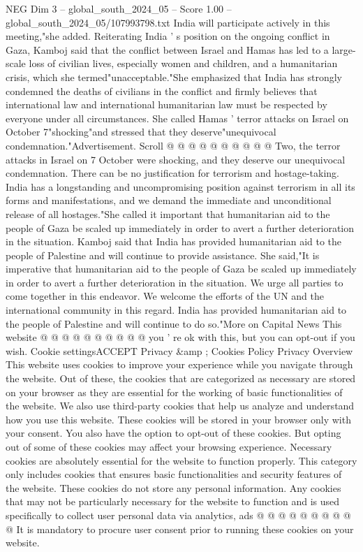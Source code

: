 \begin{textsample}{NEG Dim 3 – global\_south\_2024\_05 – Score 1.00 – global\_south\_2024\_05/107993798.txt}
India will participate actively in this meeting,"she added.
Reiterating India ' s position on the ongoing conflict in Gaza, Kamboj said that the conflict between Israel and Hamas has led to a large-scale loss of civilian lives, especially women and children, and a humanitarian crisis, which she termed"unacceptable."She emphasized that India has strongly condemned the deaths of civilians in the conflict and firmly believes that international law and international humanitarian law must be respected by everyone under all circumstances.
She called Hamas ' terror attacks on Israel on October 7"shocking"and stressed that they deserve"unequivocal condemnation."Advertisement.
Scroll @ @ @ @ @ @ @ @ @ @ Two, the terror attacks in Israel on 7 October were shocking, and they deserve our unequivocal condemnation.
There can be no justification for terrorism and hostage-taking.
India has a longstanding and uncompromising position against terrorism in all its forms and manifestations, and we demand the immediate and unconditional release of all hostages."She called it important that humanitarian aid to the people of Gaza be scaled up immediately in order to avert a further deterioration in the situation.
Kamboj said that India has provided humanitarian aid to the people of Palestine and will continue to provide assistance.
She said,"It is imperative that humanitarian aid to the people of Gaza be scaled up immediately in order to avert a further deterioration in the situation.
We urge all parties to come together in this endeavor.
We welcome the efforts of the UN and the international community in this regard.
India has provided humanitarian aid to the people of Palestine and will continue to do so."More on Capital News This website @ @ @ @ @ @ @ @ @ @ you ' re ok with this, but you can opt-out if you wish.
Cookie settingsACCEPT Privacy \&amp ; Cookies Policy Privacy Overview This website uses cookies to improve your experience while you navigate through the website.
Out of these, the cookies that are categorized as necessary are stored on your browser as they are essential for the working of basic functionalities of the website.
We also use third-party cookies that help us analyze and understand how you use this website.
These cookies will be stored in your browser only with your consent.
You also have the option to opt-out of these cookies.
But opting out of some of these cookies may affect your browsing experience.
Necessary cookies are absolutely essential for the website to function properly.
This category only includes cookies that ensures basic functionalities and security features of the website.
These cookies do not store any personal information.
Any cookies that may not be particularly necessary for the website to function and is used specifically to collect user personal data via analytics, ads @ @ @ @ @ @ @ @ @ @ It is mandatory to procure user consent prior to running these cookies on your website.

\end{textsample}
